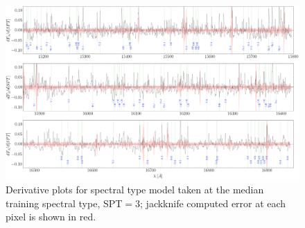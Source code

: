 \documentclass[twocolumn]{aastex62}
\begin{document}
\begin{figure}
	\begin{center}
	\includegraphics[width=16cm]{derivative_jackknife_spt.png}
	\end{center}
	\caption{Derivative plots for spectral type model taken at the median training spectral type, SPT$=3$; jackknife computed error at each pixel is shown in red.} 
	\label{fig:west_derivative}
\end{figure}


\end{document}
